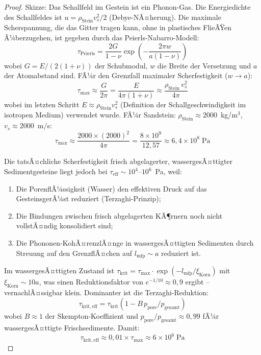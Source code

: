 ﻿\documentclass[12pt,a4paper]{report}
\begin{document}
\begin{proof}
	Skizze: Das Schallfeld im Gestein ist ein Phonon-Gas. Die Energiedichte des Schallfeldes ist $u = \rho_\mathrm{Stein} v_s^2/2$ (Debye-NÃ¤herung). Die maximale Scherspannung, die das Gitter tragen kann, ohne in plastisches FlieÃŸen Ã¼berzugehen, ist gegeben durch das Peierls-Nabarro-Modell:
	\begin{equation}
		\tau_\mathrm{Peierls} = \frac{2G}{1-\nu}\exp\!\left(-\frac{2\pi w}{a(1-\nu)}\right)
		\label{eq:peierls}
	\end{equation}
	wobei $G = E/(2(1+\nu))$ der Schubmodul, $w$ die Breite der Versetzung und $a$ der Atomabstand sind. FÃ¼r den Grenzfall maximaler Scherfestigkeit ($w \to a$):
	\begin{equation}
		\tau_\mathrm{max} \approx \frac{G}{2\pi} = \frac{E}{4\pi(1+\nu)} \approx \frac{\rho_\mathrm{Stein}\,v_s^2}{4\pi}
		\label{eq:tau_max_peierls}
	\end{equation}
	wobei im letzten Schritt $E \approx \rho_\mathrm{Stein} v_s^2$ (Definition der Schallgeschwindigkeit im isotropen Medium) verwendet wurde. FÃ¼r Sandstein: $\rho_\mathrm{Stein} \approx 2000$~kg/m$^3$, $v_s \approx 2000$~m/s:
	\begin{equation}
		\tau_\mathrm{max} \approx \frac{2000\times(2000)^2}{4\pi} = \frac{8\times10^9}{12{,}57} \approx 6{,}4\times10^8\;\text{Pa}
		\label{eq:tau_max_sandstein}
	\end{equation}
	
	Die tatsÃ¤chliche Scherfestigkeit frisch abgelagerter, wassergesÃ¤ttigter Sedimentgesteine liegt jedoch bei $\tau_\mathrm{eff} \sim 10^4$--$10^6$~Pa, weil:
	\begin{enumerate}
		\item Die PorenflÃ¼ssigkeit (Wasser) den effektiven Druck auf das GesteinsgerÃ¼st reduziert (Terzaghi-Prinzip);
		\item Die Bindungen zwischen frisch abgelagerten KÃ¶rnern noch nicht vollstÃ¤ndig konsolidiert sind;
		\item Die Phononen-KohÃ¤renzlÃ¤nge in wassergesÃ¤ttigten Sedimenten durch Streuung auf den GrenzflÃ¤chen auf $l_\mathrm{mfp} \sim a$ reduziert ist.
	\end{enumerate}
	
	Im wassergesÃ¤ttigten Zustand ist $\tau_\mathrm{krit} = \tau_\mathrm{max}\cdot\exp(-l_\mathrm{mfp}/\xi_\mathrm{Korn})$ mit $\xi_\mathrm{Korn} \sim 10a$, was einen Reduktionsfaktor von $e^{-1/10} \approx 0{,}9$ ergibt -- vernachlÃ¤ssigbar klein. Dominanter ist die Terzaghi-Reduktion:
	\begin{equation}
		\tau_\mathrm{krit,eff} = \tau_\mathrm{krit}(1 - B\,p_\mathrm{pore}/p_\mathrm{gesamt})
		\label{eq:terzaghi}
	\end{equation}
	wobei $B \approx 1$ der Skempton-Koeffizient und $p_\mathrm{pore}/p_\mathrm{gesamt} \approx 0{,}99$ fÃ¼r wassergesÃ¤ttigte Frischsedimente. Damit:
	\begin{equation}
		\tau_\mathrm{krit,eff} \approx 0{,}01\times\tau_\mathrm{max} \approx 6\times10^6\;\text{Pa}
		\label{eq:tau_krit_eff_numerisch}
	\end{equation}
	

\end{proof}
\end{document}
